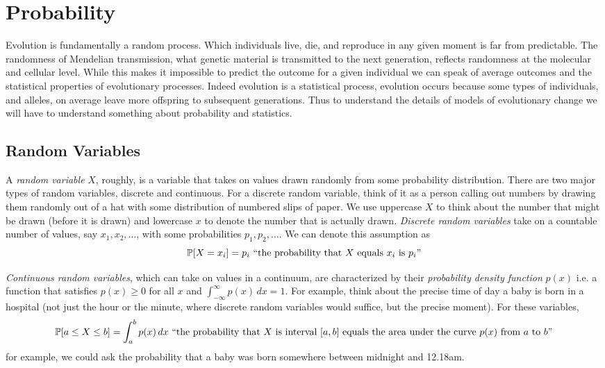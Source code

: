 \section{Probability}
Evolution is fundamentally a random process. Which individuals live,
die, and reproduce in any given moment is far from predictable. The randomness of Mendelian transmission, what genetic material
is transmitted to the next generation, reflects randomness at the
molecular and cellular level. While this makes it impossible to
predict the outcome for a given individual we can speak of average
outcomes and the statistical properties of evolutionary
processes. Indeed evolution is a statistical process,
evolution occurs because some types of individuals, and alleles, on
average leave more offspring to subsequent generations. Thus to
understand the details of models of evolutionary change we will have to understand something
about probability and statistics. 

\subsection{Random Variables} \label{Section_rv}

A  \emph{random variable} $X$, roughly,
is a variable that takes on values drawn randomly from some
probability distribution.  There are two major types of random
variables, discrete and continuous.  For a discrete random variable, think of it as a person calling out numbers
by drawing them randomly out of a hat with some distribution of
numbered slips of paper. We use uppercase $X$ to think about the
number that might be drawn (before it is drawn) and lowercase $x$ to denote the number that is actually drawn.
\emph{Discrete random variables} take on a countable number of values, say $x_1,x_2,\dots$, with some probabilities $p_1,p_2,\dots$. We can denote this assumption as 
\[
\P[X=x_i]=p_i \mbox{ ``the probability that $X$ equals $x_i$ is $p_i$''}
\]

 \emph{Continuous random variables},  which can take on values in a continuum, are
 characterized by their  \emph{probability density function} $p(x)$
 i.e. a function that satisfies $p(x)\ge 0$ for all $x$ and
 $\int_{-\infty}^\infty p(x)\,dx =1$. For example, think about the
 precise time of day a baby
is born in a hospital (not just the hour or the minute, where discrete
random variables would suffice, but the
precise moment). For these variables, 
\[
\P[a\le X\le b] = \int_a^b p(x)\,dx \mbox{ ``the probability that $X$ is interval $[a,b]$ equals the area under the curve $p(x)$ from $a$ to $b$''}
\]
for example, we could ask the probability that a baby was born
somewhere between
midnight and 12.18am. 

